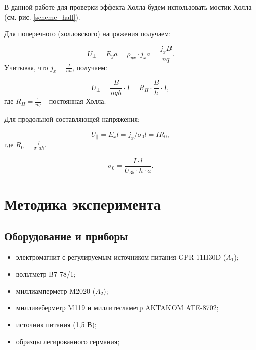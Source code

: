 \documentclass[12pt,a4paper]{article}
\newcommand{\figref}[1]{(см. рис. \ref{#1})}
\begin{document}
	В данной работе для проверки эффекта Холла будем использовать мостик Холла \figref{scheme_hall}.
	
	Для поперечного (холловского) напряжения получаем:
	
	$$ U_\perp = E_y a = \rho_{yx} \cdot j_x a= \frac{j_x B}{n q}. $$
	Учитывая, что $j_x = \frac{I}{ah}$, получаем:
	
	\begin{equation}
		\label{U_perp}
		U_\perp = \frac{B}{nqh} \cdot I = R_H \cdot \frac{B}{h} \cdot I,
	\end{equation}
	где $R_H = \frac{1}{nq}$ -- постоянная Холла.
	
	Для продольной составляющей напряжения:
	
	$$ U_\parallel = E_x l = j_x / \sigma_0 l = I R_0, $$
	где $R_0 = \frac{l}{\sigma_0 a h}$.
	
	\begin{equation}
		\label{sigma_0}
		\sigma_0 = \frac{I \cdot l}{U_{35} \cdot h \cdot a}.
	\end{equation}
	
	
	\section*{Методика эксперимента}
	
	\subsection*{Оборудование и приборы}
	\begin{itemize}[itemsep = 0pt, parsep=0pt]
		\item электромагнит с регулируемым источником пи­тания GPR-11H30D ($A_1$);
		\item вольтметр B7-78/1;
		\item миллиамперметр M2020 ($A_2$);
		\item милливеберметр M119 и мил­литесламетр AKTAKOM ATE-8702;
		\item источник питания (1,5 В);
		\item образцы легированного германия;
	\end{itemize}
	
\end{document}
